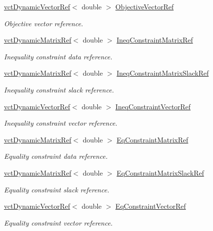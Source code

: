\begin{DoxyCompactItemize}
\hyperlink{classvct_dynamic_vector_ref}{vct\-Dynamic\-Vector\-Ref}$<$ double $>$ \hyperlink{classmts_v_f_base_a3eb71862ba4f3e84334626da145500b8}{Objective\-Vector\-Ref}
\begin{DoxyCompactList}\small\item\em Objective vector reference. \end{DoxyCompactList}\item 
\hyperlink{classvct_dynamic_matrix_ref}{vct\-Dynamic\-Matrix\-Ref}$<$ double $>$ \hyperlink{classmts_v_f_base_a5a7e70da8b7af5531051a347c5cf8a7a}{Ineq\-Constraint\-Matrix\-Ref}
\begin{DoxyCompactList}\small\item\em Inequality constraint data reference. \end{DoxyCompactList}\item 
\hyperlink{classvct_dynamic_matrix_ref}{vct\-Dynamic\-Matrix\-Ref}$<$ double $>$ \hyperlink{classmts_v_f_base_ae6d2107122aa85ffe1422877d3738e92}{Ineq\-Constraint\-Matrix\-Slack\-Ref}
\begin{DoxyCompactList}\small\item\em Inequality constraint slack reference. \end{DoxyCompactList}\item 
\hyperlink{classvct_dynamic_vector_ref}{vct\-Dynamic\-Vector\-Ref}$<$ double $>$ \hyperlink{classmts_v_f_base_a630a27c6fd52487f0981d6c6fa273823}{Ineq\-Constraint\-Vector\-Ref}
\begin{DoxyCompactList}\small\item\em Inequality constraint vector reference. \end{DoxyCompactList}\item 
\hyperlink{classvct_dynamic_matrix_ref}{vct\-Dynamic\-Matrix\-Ref}$<$ double $>$ \hyperlink{classmts_v_f_base_a2e4890accf54786167b72ab807a6c9d9}{Eq\-Constraint\-Matrix\-Ref}
\begin{DoxyCompactList}\small\item\em Equality constraint data reference. \end{DoxyCompactList}\item 
\hyperlink{classvct_dynamic_matrix_ref}{vct\-Dynamic\-Matrix\-Ref}$<$ double $>$ \hyperlink{classmts_v_f_base_afba44d1e55c4d6a1885b80f19007a3fa}{Eq\-Constraint\-Matrix\-Slack\-Ref}
\begin{DoxyCompactList}\small\item\em Equality constraint slack reference. \end{DoxyCompactList}\item 
\hyperlink{classvct_dynamic_vector_ref}{vct\-Dynamic\-Vector\-Ref}$<$ double $>$ \hyperlink{classmts_v_f_base_af88966d5b41b80821adb2d69ec8d0fa9}{Eq\-Constraint\-Vector\-Ref}
\begin{DoxyCompactList}\small\item\em Equality constraint vector reference. \end{DoxyCompactList}\end{DoxyCompactItemize}
